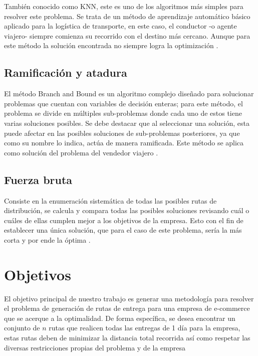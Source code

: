 \documentclass[journal]{IEEEtran}
\begin{document}
            También conocido como KNN, este es uno de los algoritmos más simples para resolver este problema. Se trata de un método de aprendizaje automático básico aplicado para la logística de transporte, en este caso, el conductor -o agente viajero- siempre comienza su recorrido con el destino más cercano. Aunque para este método la solución encontrada no siempre logra la optimización \cite{trevelingProb}.

        \subsection{Ramificación y atadura}
        
            El método Branch and Bound es un algoritmo complejo diseñado para solucionar problemas que cuentan con variables de decisión enteras; para este método, el problema se divide en múltiples sub-problemas donde cada uno de estos tiene varias soluciones posibles. Se debe destacar que al seleccionar una solución, esta puede afectar en las posibles soluciones de sub-problemas posteriores, ya que como su nombre lo indica, actúa de manera ramificada. Este método se aplica como solución del problema del vendedor viajero \cite{trevelingProb}.

        \subsection{Fuerza bruta}
        
            Consiste en la enumeración sistemática de todas las posibles rutas de distribución, se calcula y compara todas las posibles soluciones revisando cuál o cuáles de ellas cumplen mejor a los objetivos de la empresa. Esto con el fin de establecer una única solución, que para el caso de este problema, sería la más corta y por ende la óptima \cite{trevelingProb}.
    
    \section{Objetivos} \label{sec:objectives}

        El objetivo principal de nuestro trabajo es generar una metodología para resolver el problema de generación de rutas de entrega para una empresa de e-commerce que se acerque a la optimalidad. De forma específica, se desea encontrar un conjunto de $n$ rutas que realicen todas las entregas de 1 día para la empresa, estas rutas deben de minimizar la distancia total recorrida así como respetar las diversas restricciones propias del problema y de la empresa
\end{document}
